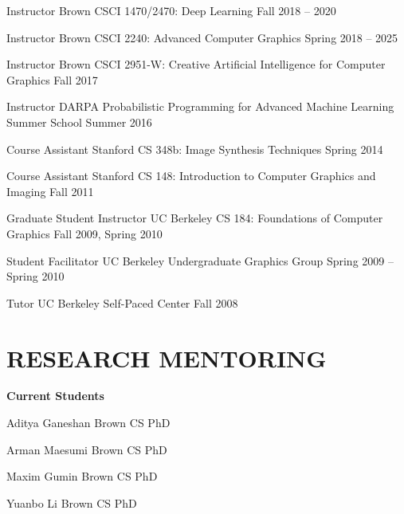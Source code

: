 \documentclass[line,margin]{res}
\begin{document}
\begin{resume}
\teach
{Instructor}
{Brown CSCI 1470/2470: Deep Learning}
{Fall 2018 -- 2020}

\teach
{Instructor}
{Brown CSCI 2240: Advanced Computer Graphics}
{Spring 2018 -- 2025}

\teach
{Instructor}
{Brown CSCI 2951-W: Creative Artificial Intelligence for Computer Graphics}
{Fall 2017}

\teach
{Instructor}
{DARPA Probabilistic Programming for Advanced Machine Learning Summer School}
{Summer 2016}

\teach
{Course Assistant}
{Stanford CS 348b: Image Synthesis Techniques}
{Spring 2014}

\teach
{Course Assistant}
{Stanford CS 148: Introduction to Computer Graphics and Imaging}
{Fall 2011}

\teach
{Graduate Student Instructor}
{UC Berkeley CS 184: Foundations of Computer Graphics}
{Fall 2009, Spring 2010}

\teach
{Student Facilitator}
{UC Berkeley Undergraduate Graphics Group}
{Spring 2009 -- Spring 2010}

\teach
{Tutor}
{UC Berkeley Self-Paced Center}
{Fall 2008}


\section{RESEARCH MENTORING}

\newcommand{\currentphd}[2] {
	#1 \hfill #2
}

\newcommand{\student}[3] {
	#1 \hfill #2 (expected #3)
}

\newcommand{\alumni}[4] {
	#1 \hfill #2 #3\\
	\emph{Next position: #4}
}

\newcommand{\visitor}[4] {
	#1 \hfill #2 #3\\
	\emph{Home institution: #4}
}

\newcommand{\thesiscomm}[3] {
	#1 \hfill #2\\
	\emph{#3}
}


\textbf{Current Students}

\currentphd
{Aditya Ganeshan}
{Brown CS PhD}

\currentphd
{Arman Maesumi}
{Brown CS PhD}

\currentphd
{Maxim Gumin}
{Brown CS PhD}

\currentphd
{Yuanbo Li}
{Brown CS PhD}


\end{resume}
\end{document}
